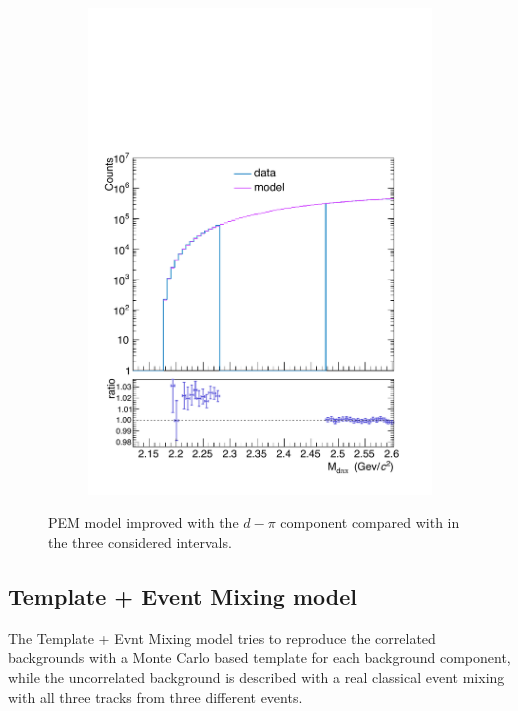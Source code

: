 \begin{figure}
\begin{subfigure}{.33\textwidth}
  \includegraphics[width=\linewidth]{gfx/PEMimp2}
  \caption{}
  \label{fig:pem_imp23}
\end{subfigure}
\caption{PEM model improved with the $d-\pi$ component compared with \minv in the three considered \pt intervals.}
\label{fig:PEMimp}
\end{figure}

%
\subsection{Template + Event Mixing model} \label{sec:tem}

The Template + Evnt Mixing model tries to reproduce the correlated backgrounds with a Monte Carlo
based template for each background component, while the uncorrelated background is described with a
real classical event mixing with all three tracks from three different events.

